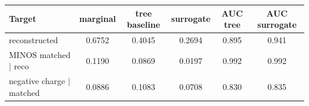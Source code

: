 \begin{tabular}{lccccc}
\toprule
Target & marginal & tree baseline & surrogate & AUC tree & AUC surrogate \\
\midrule
reconstructed & 0.6752 & 0.4045 & 0.2694 & 0.895 & 0.941 \\
MINOS matched $\mid$ reco & 0.1190 & 0.0869 & 0.0197 & 0.992 & 0.992 \\
negative charge $\mid$ matched & 0.0886 & 0.1083 & 0.0708 & 0.830 & 0.835 \\
\bottomrule
\end{tabular}
